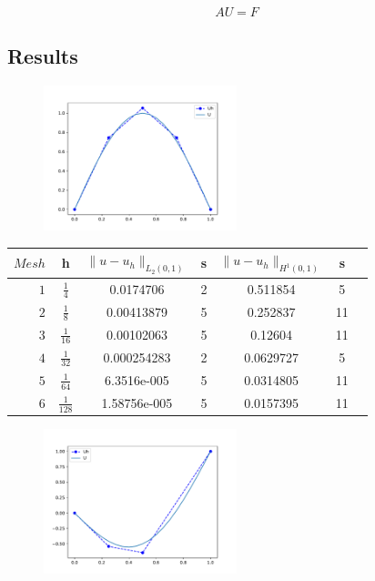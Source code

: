 \documentclass{uonmathreport}
\theoremstyle{definition}
\theoremstyle{problem}
\theoremstyle{theorem}
\begin{document}
\begin{equation}
AU = F			\label{eq:system1}
\end{equation}

\subsection{Results} \label{subsec:results1}

\begin{figure}[h]
   \includegraphics[width=0.5\textwidth]{EllipticPDE2.pdf}
   
 \label{fig:eliptic1}
\end{figure}

\begin{center}
  \begin{tabular}{r|cccccc}
    $Mesh$   & h & $\|u-u_h\|_{L_2(0,1)}$ & s & $\|u-u_h\|_{H^1(0,1)}$ & s  \\ \hline
    $1$ & $\tfrac{1}{4}$ & 0.0174706 & 2 & 0.511854 & 5  \\
    $2$ & $\tfrac{1}{8}$ & 0.00413879 & 5 & 0.252837 & 11  \\
    $3$ & $\tfrac{1}{16}$ & 0.00102063 & 5 & 0.12604 & 11  \\
	$4$ & $\tfrac{1}{32}$ & 0.000254283 & 2 & 0.0629727 & 5 \\
    $5$ & $\tfrac{1}{64}$ & 6.3516e-005 & 5 & 0.0314805 & 11  \\
    $6$ & $\tfrac{1}{128}$ & 1.58756e-005 & 5 & 0.0157395 & 11 \\
  \end{tabular}
\end{center}




\begin{figure}[h]
   \includegraphics[width=0.5\textwidth]{EllipticPDE1_hi.pdf}
   
 \label{fig:eliptic1}
\end{figure}
\end{document}
